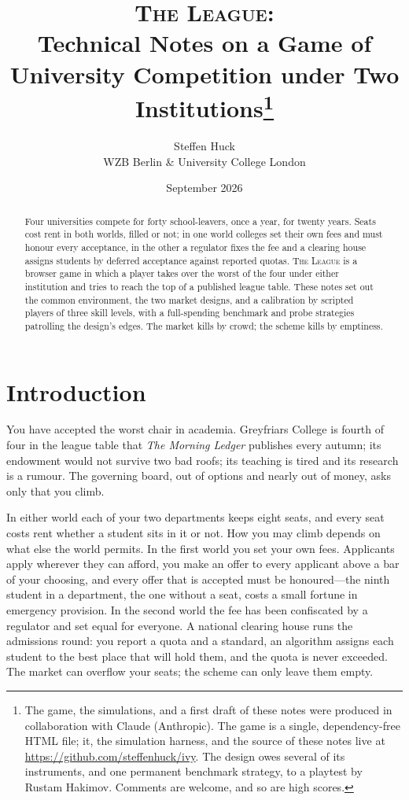 \documentclass[11pt,a4paper]{article}
\title{\textsc{The League}:\\[2pt] \large Technical Notes on a Game of University Competition under Two Institutions\thanks{The game, the simulations, and a first draft of these notes were produced in collaboration with Claude (Anthropic). The game is a single, dependency-free HTML file; it, the simulation harness, and the source of these notes live at \url{https://github.com/steffenhuck/ivy}. The design owes several of its instruments, and one permanent benchmark strategy, to a playtest by Rustam Hakimov. Comments are welcome, and so are high scores.}}
\author{Steffen Huck\\ \normalsize WZB Berlin \& University College London}
\date{September 2026}
\newcommand{\game}{\textsc{The League}}
\begin{document}
\maketitle

\begin{abstract}
\noindent Four universities compete for forty school-leavers, once a year, for twenty years. Seats cost rent in both worlds, filled or not; in one world colleges set their own fees and must honour every acceptance, in the other a regulator fixes the fee and a clearing house assigns students by deferred acceptance against reported quotas. \game{} is a browser game in which a player takes over the worst of the four under either institution and tries to reach the top of a published league table. These notes set out the common environment, the two market designs, and a calibration by scripted players of three skill levels, with a full-spending benchmark and probe strategies patrolling the design's edges. The market kills by crowd; the scheme kills by emptiness.
\end{abstract}

\section{Introduction}

You have accepted the worst chair in academia. Greyfriars College is fourth of four in the league table that \emph{The Morning Ledger} publishes every autumn; its endowment would not survive two bad roofs; its teaching is tired and its research is a rumour. The governing board, out of options and nearly out of money, asks only that you climb.

In either world each of your two departments keeps eight seats, and every seat costs rent whether a student sits in it or not. How you may climb depends on what else the world permits. In the first world you set your own fees. Applicants apply wherever they can afford, you make an offer to every applicant above a bar of your choosing, and every offer that is accepted must be honoured---the ninth student in a department, the one without a seat, costs a small fortune in emergency provision. In the second world the fee has been confiscated by a regulator and set equal for everyone. A national clearing house runs the admissions round: you report a quota and a standard, an algorithm assigns each student to the best place that will hold them, and the quota is never exceeded. The market can overflow your seats; the scheme can only leave them empty.
\end{document}
